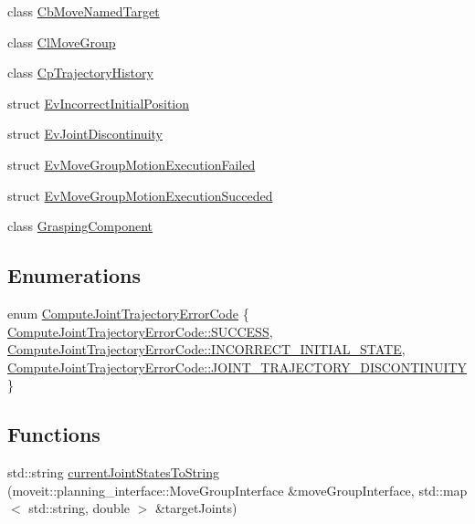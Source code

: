 \begin{DoxyCompactItemize}
\item 
class \hyperlink{classcl__move__group__interface_1_1CbMoveNamedTarget}{Cb\+Move\+Named\+Target}
\item 
class \hyperlink{classcl__move__group__interface_1_1ClMoveGroup}{Cl\+Move\+Group}
\item 
class \hyperlink{classcl__move__group__interface_1_1CpTrajectoryHistory}{Cp\+Trajectory\+History}
\item 
struct \hyperlink{structcl__move__group__interface_1_1EvIncorrectInitialPosition}{Ev\+Incorrect\+Initial\+Position}
\item 
struct \hyperlink{structcl__move__group__interface_1_1EvJointDiscontinuity}{Ev\+Joint\+Discontinuity}
\item 
struct \hyperlink{structcl__move__group__interface_1_1EvMoveGroupMotionExecutionFailed}{Ev\+Move\+Group\+Motion\+Execution\+Failed}
\item 
struct \hyperlink{structcl__move__group__interface_1_1EvMoveGroupMotionExecutionSucceded}{Ev\+Move\+Group\+Motion\+Execution\+Succeded}
\item 
class \hyperlink{classcl__move__group__interface_1_1GraspingComponent}{Grasping\+Component}
\end{DoxyCompactItemize}
\subsection*{Enumerations}
\begin{DoxyCompactItemize}
\item 
enum \hyperlink{namespacecl__move__group__interface_ae5fc1caf9a16ae5ad1c97c2e137a7017}{Compute\+Joint\+Trajectory\+Error\+Code} \{ \hyperlink{namespacecl__move__group__interface_ae5fc1caf9a16ae5ad1c97c2e137a7017ad0749aaba8b833466dfcbb0428e4f89c}{Compute\+Joint\+Trajectory\+Error\+Code\+::\+S\+U\+C\+C\+E\+SS}, 
\hyperlink{namespacecl__move__group__interface_ae5fc1caf9a16ae5ad1c97c2e137a7017a1b748367c8d468cb9b65ecd6b2eab32c}{Compute\+Joint\+Trajectory\+Error\+Code\+::\+I\+N\+C\+O\+R\+R\+E\+C\+T\+\_\+\+I\+N\+I\+T\+I\+A\+L\+\_\+\+S\+T\+A\+TE}, 
\hyperlink{namespacecl__move__group__interface_ae5fc1caf9a16ae5ad1c97c2e137a7017a3e86842785cd7c42003e516418347c8e}{Compute\+Joint\+Trajectory\+Error\+Code\+::\+J\+O\+I\+N\+T\+\_\+\+T\+R\+A\+J\+E\+C\+T\+O\+R\+Y\+\_\+\+D\+I\+S\+C\+O\+N\+T\+I\+N\+U\+I\+TY}
 \}
\end{DoxyCompactItemize}
\subsection*{Functions}
\begin{DoxyCompactItemize}
\item 
std\+::string \hyperlink{namespacecl__move__group__interface_aad71400738b3e25d9fa9ac924670de5d}{current\+Joint\+States\+To\+String} (moveit\+::planning\+\_\+interface\+::\+Move\+Group\+Interface \&move\+Group\+Interface, std\+::map$<$ std\+::string, double $>$ \&target\+Joints)
\end{DoxyCompactItemize}


